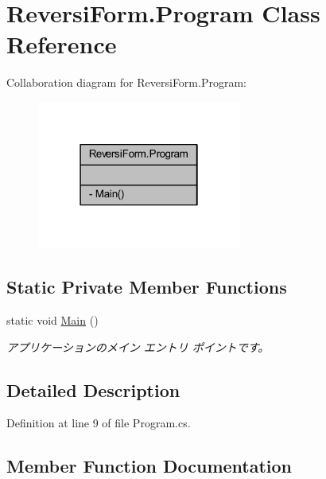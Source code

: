 \hypertarget{class_reversi_form_1_1_program}{}\section{Reversi\+Form.\+Program Class Reference}
\label{class_reversi_form_1_1_program}


Collaboration diagram for Reversi\+Form.\+Program\+:
\nopagebreak
\begin{figure}[H]
\begin{center}
\leavevmode
\includegraphics[width=190pt]{class_reversi_form_1_1_program__coll__graph}
\end{center}
\end{figure}
\subsection*{Static Private Member Functions}
\begin{DoxyCompactItemize}
\item 
static void \hyperlink{class_reversi_form_1_1_program_a0d307c8bc3af65198f8bc1cef61e050f}{Main} ()
\begin{DoxyCompactList}\small\item\em アプリケーションのメイン エントリ ポイントです。 \end{DoxyCompactList}\end{DoxyCompactItemize}


\subsection{Detailed Description}


Definition at line 9 of file Program.\+cs.



\subsection{Member Function Documentation}
\mbox{\label{class_reversi_form_1_1_program_a0d307c8bc3af65198f8bc1cef61e050f}} 
